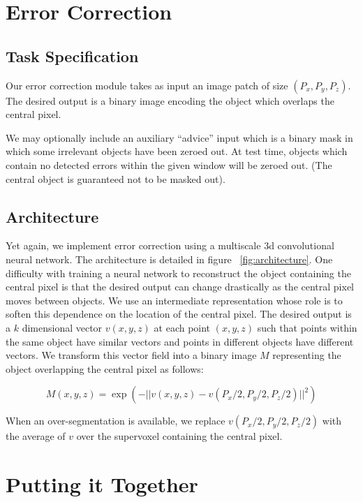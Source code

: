 \documentclass{article}
\begin{document}
\section{Error Correction}
\subsection{Task Specification}
Our error correction module takes as input an image patch of size $(P_x, P_y, P_z)$. The desired output is a binary image encoding the object which overlaps the central pixel. 

We may optionally include an auxiliary ``advice'' input which is a binary mask in which some irrelevant objects have been zeroed out. At test time, objects which contain no detected errors within the given window will be zeroed out.  (The central object is guaranteed not to be masked out). 

\subsection{Architecture}
Yet again, we implement error correction using a multiscale 3d convolutional neural network. The architecture is detailed in figure ~\ref{fig:architecture}. One difficulty with training a neural network to reconstruct the object containing the central pixel is that the desired output can change drastically as the central pixel moves between objects. We use an intermediate representation whose role is to soften this dependence on the location of the central pixel. The desired output is a $k$ dimensional vector $v(x,y,z)$ at each point $(x,y,z)$ such that points within the same object have similar vectors and points in different objects have different vectors. We transform this vector field into a binary image $M$ representing the object overlapping the central pixel as follows:

\begin{equation*}
	M(x,y,z)=\exp(-||v(x,y,z)-v(P_x/2,P_y/2,P_z/2)||^2)
\end{equation*}

When an over-segmentation is available, we replace $v(P_x/2,P_y/2,P_z/2)$ with the average of $v$ over the supervoxel containing the central pixel.


\section{Putting it Together}
\end{document}
